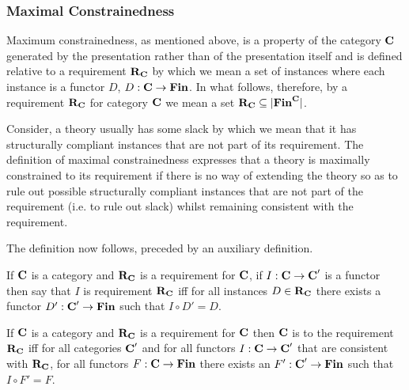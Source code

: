 \subsubsection{Maximal Constrainedness}
Maximum constrainedness, as mentioned above, is a property of the category $\textbf{C}$ generated by the presentation  rather than of the presentation itself and is defined  relative to a requirement $\textbf{R}_{\textbf{C}}$ by which we mean a set of 
instances where each instance is a functor $D$, $D: \textbf{C} \rightarrow \textbf{Fin}$. In what follows, therefore,  by a requirement $\textbf{R}_{\textbf{C}}$ for category $\textbf{C}$ we mean a set  $\textbf{R}_{\textbf{C}} \subseteq | \textbf{Fin}^{\textbf{C}} |$. 

Consider, a theory usually has some slack by which we mean that it has structurally compliant instances that are not part of its requirement.  The definition of maximal constrainedness expresses that a theory is maximally constrained to its requirement if there is no way of extending the theory so as to rule out possible structurally compliant instances that are not part of the requirement (i.e. to rule out slack) whilst remaining consistent with the requirement.

The definition now follows, preceded by an auxiliary definition.
\begin{definition}
If $\textbf{C}$ is a category and $\textbf{R}_{\textbf{C}}$ is a requirement for $\textbf{C}$,  if $I: \textbf{C} \rightarrow \textbf{C}'$ is a functor then say that $I$ is  requirement $\textbf{R}_{\textbf{C}}$ iff for all instances $D \in \textbf{R}_{\textbf{C}}$ there exists a functor $D':\textbf{C}' \rightarrow \textbf{Fin}$ such that $I \circ D'=D$.
\end{definition}
\begin{definition}
If $\textbf{C}$ is a category and $\textbf{R}_{\textbf{C}}$ is a requirement for $\textbf{C}$ then $\textbf{C}$ is  to the requirement $\textbf{R}_{\textbf{C}}$ iff for all categories $\textbf{C}'$ and for all functors $I:\textbf{C} \rightarrow \textbf{C}'$ that are consistent with $\textbf{R}_{\textbf{C}}$, for all functors $F: \textbf{C} \rightarrow \textbf{Fin}$  there exists an $F' : \textbf{C}' \rightarrow \textbf{Fin}$ such that $I \circ F'=F$.
\end{definition}



